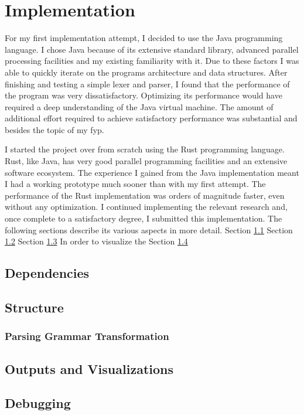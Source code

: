 \chapter{Implementation} \label{implementation}

For my first implementation attempt, I decided to use the Java programming
language. I chose Java because of its extensive standard library, advanced
parallel processing facilities and my existing familiarity with it. Due to
these factors I was able to quickly iterate on the programs architecture and
data structures. After finishing and testing a simple lexer and parser, I
found that the performance of the program was very dissatisfactory. Optimizing
its performance would have required a deep understanding of the Java virtual
machine. The amount of additional effort required to achieve satisfactory
performance was substantial and besides the topic of my \gls{fyp}.

I started the project over from scratch using the Rust programming language.
Rust, like Java, has very good parallel programming facilities and an extensive
software ecosystem. The experience I gained from the Java implementation meant I
had a working prototype much sooner than with my first attempt. The performance
of the Rust implementation was orders of magnitude faster, even without any
optimization. I continued implementing the relevant research and, once complete
to a satisfactory degree, I submitted this implementation. The following
sections describe its various aspects in more detail.
\newline \newline
Section \ref{dependancies}
\newline \newline
Section \ref{structure}
\newline \newline
Section \ref{outputs_and_visualizations}
In order to visualize the
\newline \newline
Section \ref{debugging}

\section{Dependencies} \label{dependancies}
\section{Structure} \label{structure}
\subsection{Parsing Grammar Transformation} \label{parsing_grammar_transformation}
\section{Outputs and Visualizations} \label{outputs_and_visualizations}
\section{Debugging} \label{debugging}
